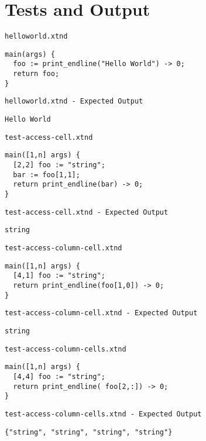 \chapter{Tests and Output}


\medskip \noindent \texttt{helloworld.xtnd}


\begin{lstlisting}
main(args) {
  foo := print_endline("Hello World") -> 0;
  return foo;
}
\end{lstlisting}


\medskip \noindent \texttt{helloworld.xtnd - Expected Output}


\begin{lstlisting}
Hello World
\end{lstlisting}


\medskip \noindent \texttt{test-access-cell.xtnd}


\begin{lstlisting}
main([1,n] args) {
  [2,2] foo := "string";
  bar := foo[1,1];
  return print_endline(bar) -> 0;
}
\end{lstlisting}


\medskip \noindent \texttt{test-access-cell.xtnd - Expected Output}


\begin{lstlisting}
string
\end{lstlisting}


\medskip \noindent \texttt{test-access-column-cell.xtnd}


\begin{lstlisting}
main([1,n] args) {
  [4,1] foo := "string";
  return print_endline(foo[1,0]) -> 0;
}
\end{lstlisting}


\medskip \noindent \texttt{test-access-column-cell.xtnd - Expected Output}


\begin{lstlisting}
string
\end{lstlisting}


\medskip \noindent \texttt{test-access-column-cells.xtnd}


\begin{lstlisting}
main([1,n] args) {
  [4,4] foo := "string";
  return print_endline( foo[2,:]) -> 0;
}
\end{lstlisting}


\medskip \noindent \texttt{test-access-column-cells.xtnd - Expected Output}


\begin{lstlisting}
{"string", "string", "string", "string"}
\end{lstlisting}


